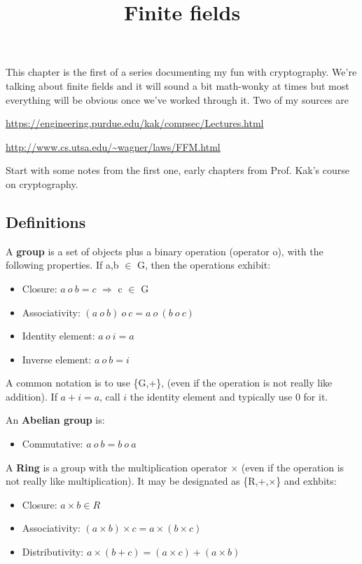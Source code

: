 \documentclass[11pt, oneside]{article}
\title{Finite fields}
\date{}
\begin{document}
\maketitle

\Large

This chapter is the first of a series documenting my fun with cryptography.  We're talking about finite fields and it will sound a bit math-wonky at times but most everything will be obvious once we've worked through it.  Two of my sources are

\url{https://engineering.purdue.edu/kak/compsec/Lectures.html}

\url{http://www.cs.utsa.edu/~wagner/laws/FFM.html}

Start with some notes from the first one, early chapters from Prof. Kak's course on cryptography.

\subsection*{Definitions}

A \textbf{group} is a set of objects plus a binary operation (operator o), with the following properties.  If a,b $\in$ G, then the operations exhibit:

\begin{itemize}
\item Closure:           $a \ o \ b = c$ $\Rightarrow$ c $\in$ G
\item Associativity:    $(a \ o \ b) \ o \ c = a \ o \ (b \ o \ c)$
\item Identity element:  $a \ o \ i = a$
\item Inverse element:   $a \ o \ b = i$
\end{itemize}

A common notation is to use \{G,+\}, (even if the operation is not really like addition).  If $a + i = a$, call $i$ the identity element and typically use $0$ for it.

An \textbf{Abelian group} is:
\begin{itemize}
\item Commutative:       $a \ o \ b = b \ o \ a$
\end{itemize}

A \textbf{Ring} is a group with the multiplication operator $\times$ (even if the operation is not really like multiplication).  It may be designated as \{R,+,$\times$\} and exhbits:
\begin{itemize}
\item Closure:           $a \times b \in R$
\item Associativity:     $(a \times b) \times c = a \times (b \times c)$
\item Distributivity:    $a \times (b + c) = (a \times c) + (a \times b)$
\end{itemize}
\end{document}
